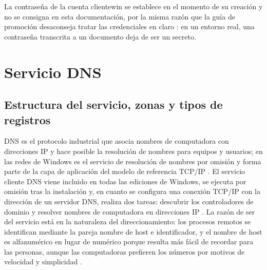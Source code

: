 \documentclass[12pt]{article}
\begin{document}
La contraseña de la cuenta clientewin se establece en el momento de su creación y no se consigna en esta documentación, por la misma razón que la guía de promoción desaconseja tratar las credenciales en claro \parencite{microsoftInstallADDS}: en un entorno real, una contraseña transcrita a un documento deja de ser un secreto.

\section{Servicio DNS}
\label{sec:servicioDns}

\subsection{Estructura del servicio, zonas y tipos de registros}
\label{sec:estructuraDns}

DNS es el protocolo industrial que asocia nombres de computadora con direcciones IP y hace posible la resolución de nombres para equipos y usuarios; en las redes de Windows es el servicio de resolución de nombres por omisión y forma parte de la capa de aplicación del modelo de referencia TCP/IP \parencite{microsoftDnsOverview}. El servicio cliente DNS viene incluido en todas las ediciones de Windows, se ejecuta por omisión tras la instalación y, en cuanto se configura una conexión TCP/IP con la dirección de un servidor DNS, realiza dos tareas: descubrir los controladores de dominio y resolver nombres de computadora en direcciones IP \parencite{microsoftDnsOverview}. La razón de ser del servicio está en la naturaleza del direccionamiento: los procesos remotos se identifican mediante la pareja nombre de host e identificador, y el nombre de host es alfanumérico en lugar de numérico porque resulta más fácil de recordar para las personas, aunque las computadoras prefieren los números por motivos de velocidad y simplicidad \parencite[\S 16.5.1, p.\ 567]{silberschatz2006fundamentos}.
\end{document}
